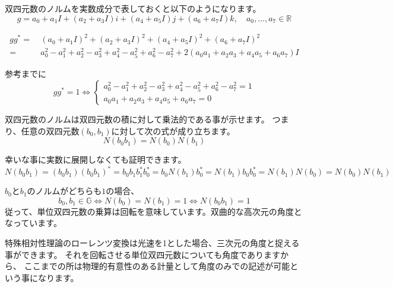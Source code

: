 \documentclass[a4paper,12pt,notitlepage]{jsreport}
\begin{document}
双四元数のノルムを実数成分で表しておくと以下のようになります。
\begin{equation}
  g=a_0+a_1I+(a_2+a_3I)i+(a_4+a_5I)j+(a_6+a_7I)k,\quad a_0,..., a_7\in\mathbb{R}
\end{equation}

\begin{equation}
  \begin{split}
    gg^*=~&(a_0+a_1I)^2+(a_2+a_3I)^2+(a_4+a_5I)^2+(a_6+a_7I)^2\\
    =~&a_0^2-a_1^2+a_2^2-a_3^2+a_4^2-a_5^2+a_6^2-a_7^2+2(a_0a_1+a_2a_3+a_4a_5+a_6a_7)I
  \end{split}
\end{equation}

参考までに
\begin{equation}
  gg^*=1\iff
  \begin{cases}
    a_0^2-a_1^2+a_2^2-a_3^2+a_4^2-a_5^2+a_6^2-a_7^2=1\\
    a_0a_1+a_2a_3+a_4a_5+a_6a_7=0
  \end{cases}
\end{equation}

双四元数のノルムは双四元数の積に対して乗法的である事が示せます。
つまり、任意の双四元数$(b_0,b_1)$に対して次の式が成り立ちます。
\begin{equation}
  N(b_0b_1)=N(b_0)N(b_1)
\end{equation}

幸いな事に実数に展開しなくても証明できます。
\begin{equation}
  N(b_0b_1)=(b_0b_1)(b_0b_1)^*=b_0b_1b_1^*b_0^*=b_0N(b_1)b_0^*=N(b_1)b_0b_0^*=N(b_1)N(b_0)=N(b_0)N(b_1)
\end{equation}

$b_0$と$b_1$のノルムがどちらも$1$の場合、
\begin{equation}
  b_0,b_1\in\mathbb{G}\iff N(b_0)=N(b_1)=1\iff N(b_0b_1)=1
\end{equation}
従って、単位双四元数の乗算は回転を意味しています。双曲的な高次元の角度となっています。

特殊相対性理論のローレンツ変換は光速を1とした場合、三次元の角度と捉える事ができます。
それを回転させる単位双四元数についても角度でありますから、
ここまでの所は物理的有意性のある計量として角度のみでの記述が可能という事になります。
\end{document}
